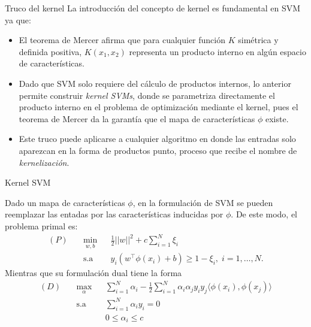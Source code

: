 \documentclass[9pt]{beamer}
\begin{document}
\begin{frame}{Truco del kernel}
	La introducción del concepto de kernel es fundamental en SVM ya que:
	
	\begin{itemize}
		\item El teorema de Mercer afirma que para cualquier función $K$ simétrica y definida positiva, $K(x_1,x_2)$ representa un producto interno en algún espacio de características.\pause
		\item  Dado que SVM solo requiere del cálculo de productos internos, lo anterior permite construir \emph{kernel SVMs}, donde se parametriza directamente el producto interno en el problema de optimización mediante el kernel, pues el teorema de Mercer da la garantía que el mapa de características $\phi$ existe.\pause
		\item Este truco puede aplicarse a cualquier algoritmo en donde las entradas solo aparezcan en la forma de productos punto, proceso que recibe el nombre de \emph{kernelización}. 
	\end{itemize}
	 
\end{frame}

\begin{frame}{Kernel SVM}

Dado un mapa de características $\phi$, en la formulación de SVM se pueden reemplazar las entadas por las características inducidas por $\phi$. De este modo, el problema primal es:
\begin{equation*}
\begin{aligned}
(P)\quad & \underset{w,b}{\text{min}}
& & \frac{1}{2}||w||^2 + c\sum\limits_{i=1}^{N} \xi_i\\
& \text{s.a}
& & y_i (w^\top \phi(x_i) +b) \geq 1- \xi_i, \; i = 1, \ldots, N.
\end{aligned}
\end{equation*}\pause
Mientras que su formulación dual tiene la forma
\begin{equation*}
\begin{aligned}
(D)\quad & \underset{\alpha}{\text{max}}
& & \sum\limits_{i=1}^{N}\alpha_i - \frac{1}{2} \sum\limits_{i=1}^{N} \alpha_i \alpha_j y_i y_j \langle\phi(x_i), \phi(x_j)\rangle\\
& \text{s.a}
& & \sum\limits_{i=1}^{N} \alpha_i y_i= 0 \\
& &  &0 \leq \alpha_i \leq c
\end{aligned}
\end{equation*}


\end{frame}
\end{document}
